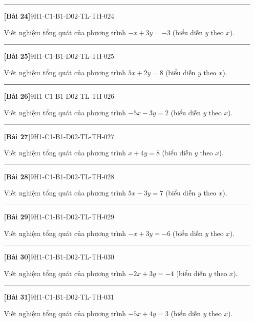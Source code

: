 \documentclass[12pt,a4paper]{article}
\newif\ifloigiai
\newenvironment{cauhoi}[2]{%
  \par\medskip\noindent\rule{\textwidth}{0.4pt}\par\nopagebreak
  \noindent\textbf{[#1]}\hfill{\scriptsize\ttfamily #2}\par\nopagebreak\smallskip}{\par}
\newcommand{\loigiai}[1]{\ifloigiai\par\smallskip\noindent\textit{Lời giải.} #1\par\fi}
\begin{document}
\begin{cauhoi}{Bài 24}{9H1-C1-B1-D02-TL-TH-024}
Viết nghiệm tổng quát của phương trình $-x+3y=-3$ (biểu diễn $y$ theo $x$).
\loigiai{Ta có $3y=-3+x$ nên $y=\dfrac{1}{3}x-1$. Nghiệm tổng quát là $(x;\,\dfrac{1}{3}x-1)$ với $x\in\mathbb R$.}
\end{cauhoi}
\begin{cauhoi}{Bài 25}{9H1-C1-B1-D02-TL-TH-025}
Viết nghiệm tổng quát của phương trình $5x+2y=8$ (biểu diễn $y$ theo $x$).
\loigiai{Ta có $2y=8-5x$ nên $y=-\dfrac{5}{2}x+4$. Nghiệm tổng quát là $(x;\,-\dfrac{5}{2}x+4)$ với $x\in\mathbb R$.}
\end{cauhoi}
\begin{cauhoi}{Bài 26}{9H1-C1-B1-D02-TL-TH-026}
Viết nghiệm tổng quát của phương trình $-5x-3y=2$ (biểu diễn $y$ theo $x$).
\loigiai{Ta có $-3y=2+5x$ nên $y=-\dfrac{5}{3}x-\dfrac{2}{3}$. Nghiệm tổng quát là $(x;\,-\dfrac{5}{3}x-\dfrac{2}{3})$ với $x\in\mathbb R$.}
\end{cauhoi}
\begin{cauhoi}{Bài 27}{9H1-C1-B1-D02-TL-TH-027}
Viết nghiệm tổng quát của phương trình $x+4y=8$ (biểu diễn $y$ theo $x$).
\loigiai{Ta có $4y=8-x$ nên $y=-\dfrac{1}{4}x+2$. Nghiệm tổng quát là $(x;\,-\dfrac{1}{4}x+2)$ với $x\in\mathbb R$.}
\end{cauhoi}
\begin{cauhoi}{Bài 28}{9H1-C1-B1-D02-TL-TH-028}
Viết nghiệm tổng quát của phương trình $5x-3y=7$ (biểu diễn $y$ theo $x$).
\loigiai{Ta có $-3y=7-5x$ nên $y=\dfrac{5}{3}x-\dfrac{7}{3}$. Nghiệm tổng quát là $(x;\,\dfrac{5}{3}x-\dfrac{7}{3})$ với $x\in\mathbb R$.}
\end{cauhoi}
\begin{cauhoi}{Bài 29}{9H1-C1-B1-D02-TL-TH-029}
Viết nghiệm tổng quát của phương trình $-x+3y=-6$ (biểu diễn $y$ theo $x$).
\loigiai{Ta có $3y=-6+x$ nên $y=\dfrac{1}{3}x-2$. Nghiệm tổng quát là $(x;\,\dfrac{1}{3}x-2)$ với $x\in\mathbb R$.}
\end{cauhoi}
\begin{cauhoi}{Bài 30}{9H1-C1-B1-D02-TL-TH-030}
Viết nghiệm tổng quát của phương trình $-2x+3y=-4$ (biểu diễn $y$ theo $x$).
\loigiai{Ta có $3y=-4+2x$ nên $y=\dfrac{2}{3}x-\dfrac{4}{3}$. Nghiệm tổng quát là $(x;\,\dfrac{2}{3}x-\dfrac{4}{3})$ với $x\in\mathbb R$.}
\end{cauhoi}
\begin{cauhoi}{Bài 31}{9H1-C1-B1-D02-TL-TH-031}
Viết nghiệm tổng quát của phương trình $-5x+4y=3$ (biểu diễn $y$ theo $x$).
\loigiai{Ta có $4y=3+5x$ nên $y=\dfrac{5}{4}x+\dfrac{3}{4}$. Nghiệm tổng quát là $(x;\,\dfrac{5}{4}x+\dfrac{3}{4})$ với $x\in\mathbb R$.}
\end{cauhoi}
\end{document}
